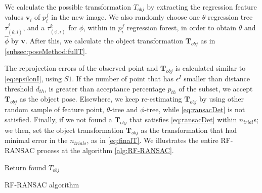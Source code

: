 \documentclass[annual]{acmsiggraph}
\begin{document}
We calculate the possible transformation $T_{obj}$ by extracting the regression feature values $\mathbf{v}_i$ of $p^f_i$ in the new image. We also randomly choose one $\theta$ regression tree $\tau_{(\theta,i)}^j$, and a $\tau_{(\phi,i)}^k$ for $\phi$, within in $p^f_i$ regression forest, in order to obtain $\hat{\theta}$ and $\hat{\phi}$ by $\mathbf{v}$. After this, we calculate the object transformation $\mathbf{T}_{obj}$ as in \ref{subsec:poseMethod:fullT}. 

The reprojection errors of the observed point and $\mathbf{T}_{obj}$ is calculated similar to \eqref{eq:epsilonI}, using $S1$. If the number of point that has $\epsilon^{I}$ smaller than distance threshold $d_{th}$, is greater than acceptance percentage $p_{th}$ of the subset, we accept $\mathbf{T}_{obj}$ as the object pose. Elsewhere, we keep re-estimating $\mathbf{T}_{obj}$ by using other random sample of feature point, $\theta$-tree and $\phi$-tree, while \eqref{eq:ransacDet} is not satisfied. Finally, if we not found a $\mathbf{T}_{obj}$ that satisfies \eqref{eq:ransacDet} within $n_{trial}$s; we then, set the object transformation $\mathbf{T}_{obj}$ as the transformation that had minimal error in the $n_{trials}$, as in \eqref{eq:finalT}. We illustrates the entire RF-RANSAC process at the algorithm \ref{alg:RF-RANSAC}.

\begin{algorithm}[h]
	Return found $T_{obj}$\; 	
\caption{RF-RANSAC algorithm}
\label{alg:RF-RANSAC}	
\end{algorithm}
\end{document}
